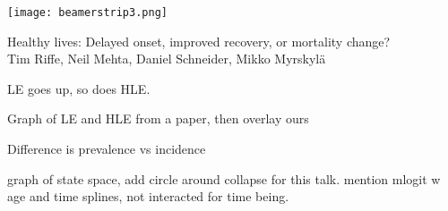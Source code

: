\documentclass[20pt,usenames,dvipsnames]{beamer}
\begin{document}

\begin{frame}[plain]
	\vspace{-3cm}
 \centerline{\texttt{[image: beamerstrip3.png]}}

	
	\huge
	\vspace{1em}
	
	Healthy lives: Delayed onset, improved recovery, or mortality
change?\\
	\vspace{1em}
	\large 
	Tim Riffe, Neil Mehta, Daniel Schneider, Mikko Myrskyl\"a 
\end{frame}

\begin{frame}[plain]
\Large
\centering
LE goes up, so does HLE. 
\end{frame}
%

\begin{frame}[plain]
\Large
\centering
Graph of LE and HLE from a paper, then overlay ours
\end{frame}
%
\begin{frame}[plain]
\Large
\centering
Difference is prevalence vs incidence
\end{frame}

\begin{frame}[plain]
\Large
\centering
graph of state space, add circle around collapse for this talk. mention mlogit w
age and time splines, not interacted for time being.
\end{frame}
\end{document}
